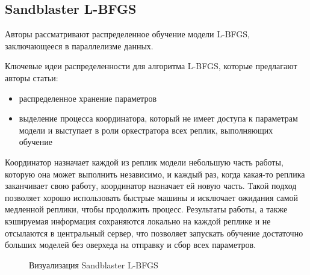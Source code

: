 \subsection{Sandblaster L-BFGS}
\indent\setlength{\parindent}{1em} 
Авторы рассматривают распределенное обучение модели L-BFGS, заключающееся в параллелизме данных.  

\indent\setlength{\parindent}{1em} 
Ключевые идеи распределенности для алгоритма L-BFGS, которые предлагают авторы статьи:
\begin{itemize}
  \item распределенное хранение параметров 
  \item выделение процесса координатора, который не имеет доступа к параметрам модели и выступает в роли оркестратора всех реплик, выполняющих обучение
\end{itemize}

\indent\setlength{\parindent}{1em} 
Координатор назначает каждой из реплик модели небольшую часть работы, которую она может выполнить независимо, и каждый раз, когда какая-то реплика заканчивает свою работу, координатор назначает ей новую часть. Такой подход позволяет хорошо использовать быстрые машины и исключает ожидания самой медленной реплики, чтобы продолжить процесс. Результаты работы, а также кэшируемая информация сохраняются локально на каждой реплике и не отсылаются в центральный сервер, что позволяет запускать обучение достаточно больших моделей без оверхеда на отправку и сбор всех параметров. 

\begin{figure}[h]%
	\centering
	\caption{Визуализация Sandblaster L-BFGS}
	\label{framework} %
\end{figure}

